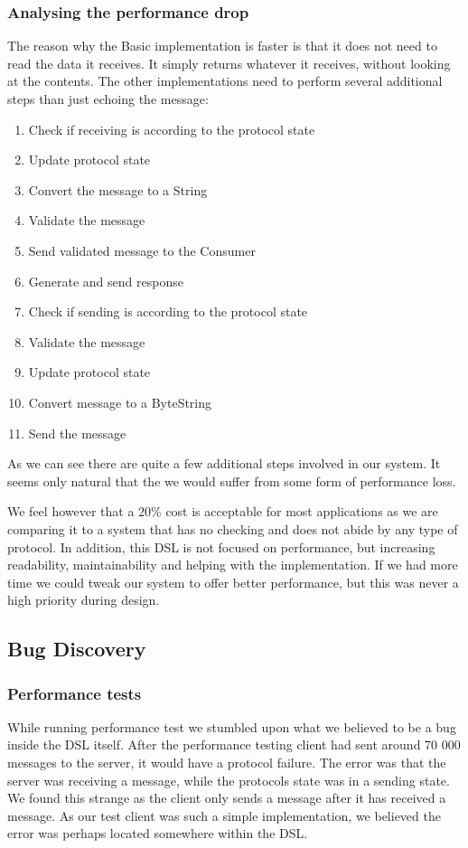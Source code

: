 \subsubsection{Analysing the performance drop}
The reason why the Basic implementation is faster is that it does not need to read the data it receives. It simply returns whatever it receives, without looking at the contents. The other implementations need to perform several additional steps than just echoing the message:
\begin{enumerate}
  \item Check if receiving is according to the protocol state
  \item Update protocol state
  \item Convert the message to a String 
  \item Validate the message
  \item Send validated message to the Consumer
  \item Generate and send response
  \item Check if sending is according to the protocol state
  \item Validate the message
  \item Update protocol state
  \item Convert message to a ByteString
  \item Send the message
\end{enumerate}
As we can see there are quite a few additional steps involved in our system. It seems only natural that the we would suffer from some form of performance loss.

We feel however that a 20\% cost is acceptable for most applications as we are comparing it to a system that has no checking and does not abide by any type of protocol. In addition, this DSL is not focused on performance, but increasing readability, maintainability and helping with the implementation. If we had more time we could tweak our system to offer better performance, but this was never a high priority during design. 


\subsection{Bug Discovery}
\subsubsection{Performance tests}
While running performance test we stumbled upon what we believed to be a bug inside the DSL itself. After the performance testing client had sent around 70 000 messages to the server, it would have a protocol failure. The error was that the server was receiving a message, while the protocols state was in a sending state. We found this strange as the client only sends a message after it has received a message. As our test client was such a simple implementation, we believed the error was perhaps located somewhere within the DSL.
 
